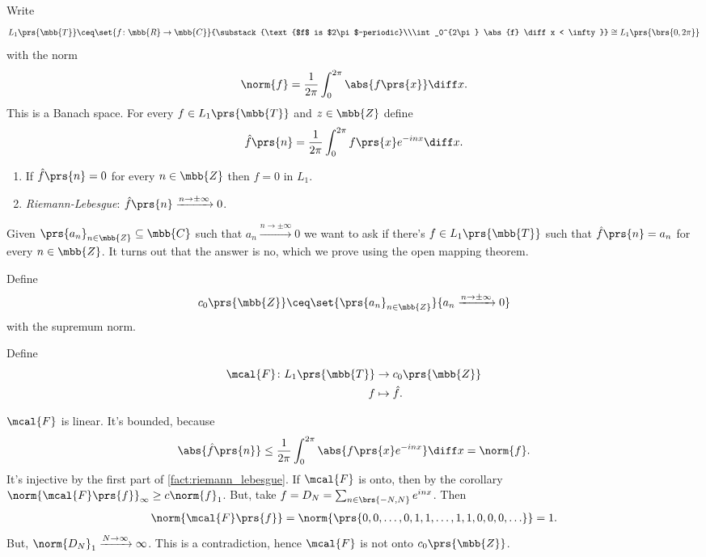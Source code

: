 \documentclass[10pt, twoside]{book}
\begin{document}
\begin{definition}
Write
\[L_1\prs{\mbb{T}} \ceq \set{f \colon \mbb{R} \to \mbb{C}}{\substack{\text{$f$ is $2\pi$-periodic}\\\int_0^{2\pi} \abs{f} \diff x < \infty}} \cong L_1\prs{\brs{0, 2 \pi}}\]
with the norm
\[\norm{f} = \frac{1}{2 \pi} \int_0^{2\pi} \abs{f\prs{x}} \diff x \text{.}\]
This is a Banach space.
For every $f \in L_1\prs{\mbb{T}}$ and $z \in \mbb{Z}$ define
\[\hat{f}\prs{n} = \frac{1}{2\pi} \int_0^{2 \pi} f\prs{x} e^{-inx} \diff x \text{.}\]
\end{definition}

\begin{fact} \label{fact:riemann_lebesgue}
\begin{enumerate}
\item If $\hat{f} \prs{n} = 0$ for every $n \in \mbb{Z}$ then $f = 0$ in $L_1$.
\item \emph{Riemann-Lebesgue}: $\hat{f}\prs{n} \xrightarrow{n\to\pm \infty} 0$.
\end{enumerate}
\end{fact}

Given $\prs{a_n}_{n \in \mbb{Z}} \subseteq \mbb{C}$ such that $a_n \xrightarrow{n \to \pm \infty} 0$ we want to ask if there's $f \in L_1\prs{\mbb{T}}$ such that $\hat{f}\prs{n} = a_n$ for every $n \in \mbb{Z}$.
It turns out that the answer is no, which we prove using the open mapping theorem.

\begin{definition}
Define
\[c_0\prs{\mbb{Z}} \ceq \set{\prs{a_n}_{n \in \mbb{Z}}}{a_n \xrightarrow{n\to\pm\infty} 0}\]
with the supremum norm.
\end{definition}

\begin{definition}
Define
\begin{align*}
\mcal{F} \colon L_1\prs{\mbb{T}} &\to c_0\prs{\mbb{Z}} \\
f &\mapsto \hat{f} \text{.}
\end{align*}
\end{definition}

\begin{remark}
$\mcal{F}$ is linear. It's bounded, because
\[\abs{\hat{f}\prs{n}} \leq \frac{1}{2\pi} \int_0^{2\pi} \abs{f\prs{x} e^{-inx}} \diff x = \norm{f} \text{.}\]
It's injective by the first part of \ref{fact:riemann_lebesgue}.
If $\mcal{F}$ is onto, then by the corollary $\norm{\mcal{F}\prs{f}}_\infty \geq c\norm{f}_1$.
But, take $f = D_N = \sum_{n \in \brs{-N,N}} e^{inx}$. Then
\begin{align*}
\norm{\mcal{F}\prs{f}} = \norm{\prs{0,0,\ldots, 0, 1, 1, \ldots, 1, 1, 0, 0, 0, \ldots}} = 1 \text{.}
\end{align*}
But, $\norm{D_N}_1 \xrightarrow{N\to\infty} \infty$.
This is a contradiction, hence $\mcal{F}$ is not onto $c_0\prs{\mbb{Z}}$.
\end{remark}
\end{document}
